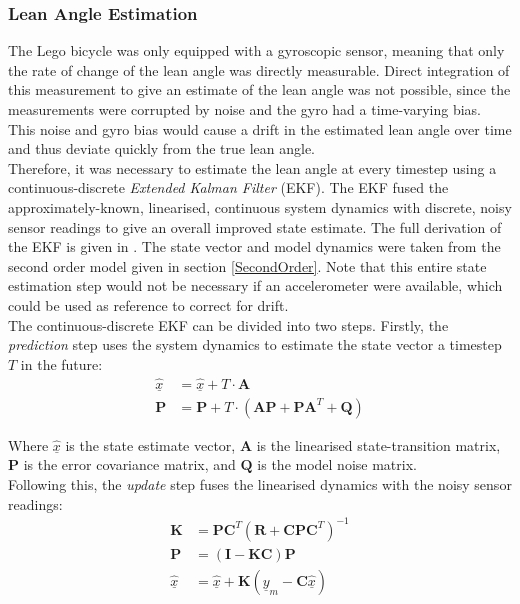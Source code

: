 \subsubsection{Lean Angle Estimation}
The Lego bicycle was only equipped with a gyroscopic sensor, meaning that only the rate of change of the lean angle was directly measurable. Direct integration of this measurement to give an estimate of the lean angle was not possible, since the measurements were corrupted by noise and the gyro had a time-varying bias. This noise and gyro bias would cause a drift in the estimated lean angle over time and thus deviate quickly from the true lean angle. \\

Therefore, it was necessary to estimate the lean angle at every timestep using a continuous-discrete \textit{Extended Kalman Filter} (EKF). The EKF fused the approximately-known, linearised, continuous system dynamics with discrete, noisy sensor readings to give an overall improved state estimate. The full derivation of the EKF is given in \cite{smalluav}. The state vector and model dynamics were taken from the second order model given in section \ref{SecondOrder}. Note that this entire state estimation step would not be necessary if an accelerometer were available, which could be used as reference to correct for drift. \\

The continuous-discrete EKF can be divided into two steps. Firstly, the \textit{prediction} step uses the system dynamics to estimate the state vector a timestep $T$ in the future:
\begin{align*}
\hat{\underline{x}} &= \hat{\underline{x}} + T \cdot \mathbf{A} \\
\mathbf{P} &= \mathbf{P} + T \cdot (\mathbf{A P} + \mathbf{P} \mathbf{A}^T + \mathbf{Q})
\end{align*}

Where $\hat{\underline{x}}$ is the state estimate vector, $\mathbf{A}$ is the linearised state-transition matrix, $\mathbf{P}$ is the error covariance matrix, and $\mathbf{Q}$ is the model noise matrix. \\

Following this, the \textit{update} step fuses the linearised dynamics with the noisy sensor readings:
\begin{align*}
\mathbf{K} &= \mathbf{P} \mathbf{C}^T (\mathbf{R} + \mathbf{C} \mathbf{P} \mathbf{C}^T)^{-1} \\
\mathbf{P} &= (\mathbf{I} - \mathbf{K C}) \mathbf{P} \\
\hat{\underline{x}} &= \hat{\underline{x}} + \mathbf{K} (\underline{y}_m - \mathbf{C} \hat{\underline{x}})
\end{align*}

